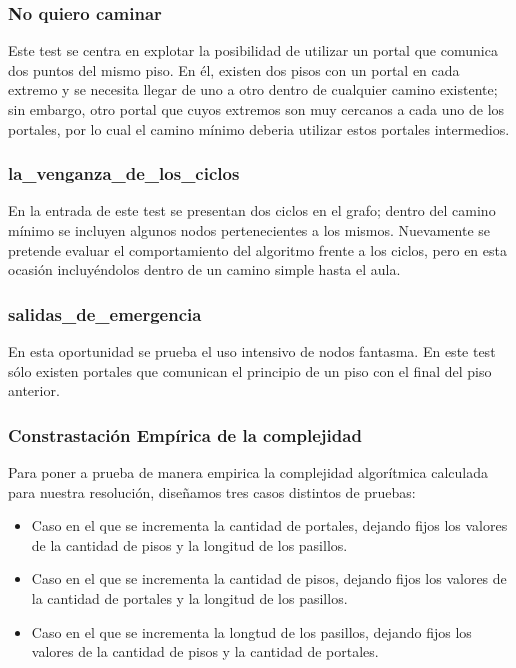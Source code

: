 \subsubsection{No quiero caminar}
Este test se centra en explotar la posibilidad de utilizar un portal que comunica dos puntos del mismo piso. En él, existen dos pisos con un portal en cada extremo y se necesita llegar de uno a otro dentro de cualquier camino existente; sin embargo, otro portal que cuyos extremos son muy cercanos a cada uno de los portales, por lo cual el camino mínimo deberia utilizar estos portales intermedios.

\subsubsection{la_venganza_de_los_ciclos}
En la entrada de este test se presentan dos ciclos en el grafo; dentro del camino mínimo se incluyen algunos nodos pertenecientes a los mismos. Nuevamente se pretende evaluar el comportamiento del algoritmo frente a los ciclos, pero en esta ocasión incluyéndolos dentro de un camino simple hasta el aula.

\subsubsection{salidas_de_emergencia}
En esta oportunidad se prueba el uso intensivo de nodos fantasma. En este test sólo existen portales que comunican el principio de un piso con el final del piso anterior.

\subsubsection{Constrastación Empírica de la complejidad}

Para poner a prueba de manera empirica la complejidad algorítmica calculada para nuestra resolución, diseñamos tres casos distintos de pruebas:
\begin{itemize}
\item{Caso en el que se incrementa la cantidad de portales, dejando fijos los valores de la cantidad de pisos y la longitud de los pasillos.}
\item{Caso en el que se incrementa la cantidad de pisos, dejando fijos los valores de la cantidad de portales y la longitud de los pasillos.}
\item{Caso en el que se incrementa la longtud de los pasillos, dejando fijos los valores de la cantidad de pisos y la cantidad de portales.}
\end{itemize}

